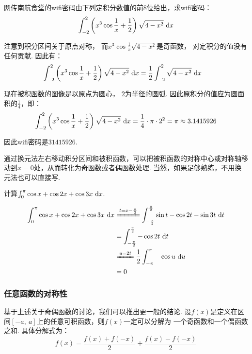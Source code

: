 \begin{example}
\label{ex:ch03-32}
网传南航食堂的wifi密码由下列定积分数值的前8位给出，求wifi密码：
$$
\int_{-2}^{2} \left( x^3 \cos\frac{1}{x} +\frac{1}{2}\right)\sqrt{4-x^2}~\mathrm{d} x
$$
\end{example}

\begin{solution}
注意到积分区间关于原点对称，
而$x^3 \cos{\frac{1}{x}}\sqrt{4-x^2}$是奇函数，
对定积分的值没有任何贡献.
因此有：
\begin{equation}
    \begin{aligned}
        \int_{-2}^{2} \left( x^3 \cos\frac{1}{x} +\frac{1}{2}\right)\sqrt{4-x^2}~\mathrm{d} x
        &= \frac{1}{2} \int_{-2}^{2}  \sqrt{4-x^2} ~\mathrm{d} x
        \nonumber
    \end{aligned}
\end{equation} \par
现在被积函数的图像是以原点为圆心，
$2$为半径的圆弧.
因此原积分的值应为圆面积的$\frac{1}{4}$，即：
$$
\int_{-2}^{2} \left( x^3 \cos\frac{1}{x} +\frac{1}{2}\right)\sqrt{4-x^2}~\mathrm{d} x
= \frac{1}{4} \cdot \pi \cdot 2^2 = \pi \approx 3.1415926
$$

因此wifi密码是$31415926$.
\end{solution}

通过换元法左右移动积分区间和被积函数，可以把被积函数的对称中心或对称轴移动到$x=0$处，从而转化为奇函数或者偶函数处理.
当然，如果足够熟练，不用换元法也可以直接写.

\begin{example}
\label{ex:ch03-33}
计算$\int_{0}^{\pi} \cos x +\cos 2x +\cos 3x ~\mathrm{d} x$.
\end{example}

\begin{solution}
\begin{equation}
    \begin{aligned}
        \int_{0}^{\pi} \cos x +\cos 2x +\cos 3x ~\d x
        &\xlongequal{t=x-\frac{\pi}{2}} \int_{-\frac{\pi}{2}}^{\frac{\pi}{2}} \sin t -\cos 2t -\sin 3t ~\d t \\
        &= \int_{-\frac{\pi}{2}}^{\frac{\pi}{2}} -\cos 2t ~\d t \\
        &\xlongequal{u=2t} \frac{1}{2}\int_{-\pi}^{\pi} -\cos u ~\d u \\
        &= 0
        \nonumber
    \end{aligned}
\end{equation}
\end{solution}

\subsubsection{任意函数的对称性}\par
基于上述关于奇偶函数的讨论，我们可以推出更一般的结论. 设$f(x)$是定义在区间$[-a,~a]$上的任意可积函数，则$f(x)$一定可以分解为
一个奇函数和一个偶函数之和. 具体分解式为：
$$
f(x) = \frac{f(x)+f(-x)}{2}+\frac{f(x)-f(-x)}{2}
$$

